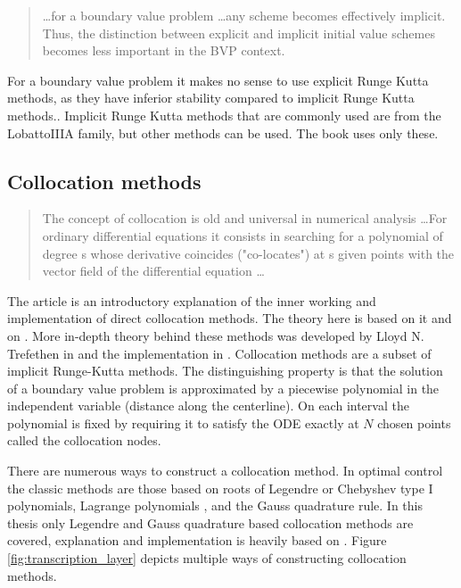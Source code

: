 \begin{quote}
    \ldots for a boundary value problem \ldots any scheme becomes effectively implicit. Thus, the distinction between explicit and implicit initial value schemes becomes less important in the BVP context.
\end{quote}
\cite[p.~69]{Ascher1995}

For a boundary value problem it makes no sense to use explicit Runge Kutta
methods, as they have inferior stability compared to implicit Runge Kutta
methods.\cite[p.~4]{raoSurveyNumericalMethods2010}. Implicit Runge Kutta methods that are commonly used are from the LobattoIIIA family, but other methods can be used. The book \cite{betts} uses
only these.

\subsection{Collocation methods}
\begin{quote}
  The concept of collocation is old and universal in numerical analysis \ldots For ordinary differential equations it consists in searching for a polynomial of degree s whose derivative coincides ("co-locates") at s given points with the vector field of the differential equation \ldots
    \cite[p.~224]{SolvingOrdinaryDifferential1987}
\end{quote}
The article \cite{kelly_traj_opt_video} is an introductory explanation of the inner working and implementation of direct collocation methods. The theory here is based on it and on \cite{garg_overview_nodate}. More in-depth theory behind these methods was developed by Lloyd N. Trefethen in \cite{trefethenApproximationTheoryApproximation} and the implementation in \cite{SpectralMethodsinMatlab}.
Collocation methods are a subset of implicit Runge-Kutta methods. The distinguishing property is that the solution of a boundary value problem is approximated by a piecewise polynomial in the independent variable (distance along the centerline). On each interval the polynomial is fixed by requiring it to satisfy the ODE exactly at $N$ chosen points called the collocation nodes. 


There are numerous ways to construct a collocation method. In optimal control the classic methods are those based on roots of Legendre or Chebyshev type I polynomials, Lagrange polynomials \cite{ELGINDY199535, gargUnifiedFrameworkNumerical2010}, and the Gauss quadrature rule. In this thesis only Legendre and Gauss quadrature based collocation methods are covered, explanation and implementation is heavily based on \cite{gargUnifiedFrameworkNumerical2010}. Figure \ref{fig:transcription_layer} depicts multiple ways of constructing collocation methods.

